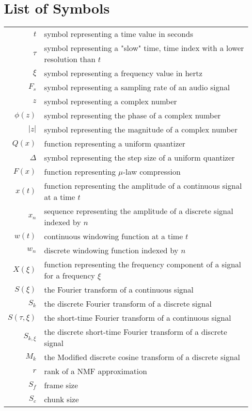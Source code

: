 \documentclass[thesis=M,english,hidelinks]{FITthesis}[2018/03/12]
\begin{document}
\chapter{List of Symbols}
\begin{tabular}{r l}
	$t$ & symbol representing a time value in seconds \\
	$\tau$ & symbol representing a "slow" time, time index with a lower resolution than $t$ \\
	$\xi$ & symbol representing a frequency value in hertz \\
	$F_s$ & symbol representing a sampling rate of an audio signal \\
	$z$ & symbol representing a complex number \\
	$\phi(z)$ & symbol representing the phase of a complex number \\
	$|z|$ & symbol representing the magnitude of a complex number \\
	$Q(x)$ & function representing a uniform quantizer \\
	$\Delta$ & symbol representing the step size of a uniform quantizer \\
	$F(x)$ & function representing $\mu$-law compression \\
	$x(t)$ & function representing the amplitude of a continuous signal at a time $t$ \\
	$x_n$ & sequence representing the amplitude of a discrete signal indexed by $n$ \\
	$w(t)$ & continuous windowing function at a time $t$ \\
	$w_n$ & discrete windowing function indexed by $n$ \\
	$X(\xi)$ & function representing the frequency component of a signal for a frequency $\xi$ \\
	$S(\xi)$ & the Fourier transform of a continuous signal \\
	$S_k$ & the discrete Fourier transform of a discrete signal \\
	$S(\tau, \xi)$ & the short-time Fourier transform of a continuous signal \\
	$S_{k, \xi}$ & the discrete short-time Fourier transform of a discrete signal \\
	$M_k$ & the Modified discrete cosine transform of a discrete signal \\
	$r$ & rank of a NMF approximation \\
	$S_f$ & frame size \\
	$S_c$ & chunk size
\end{tabular}
\end{document}
